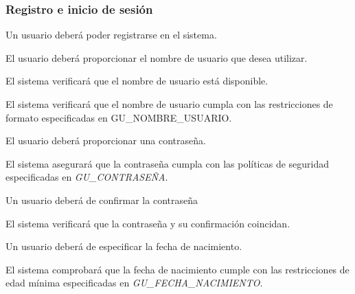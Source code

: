 


\subsubsection*{Registro e inicio de sesión}
\begin{RFGestionUsuarios}
	\item Un usuario deberá poder registrarse en el sistema.\label{req_registro}
	\begin{RFGestionUsuarios}
		\item El usuario deberá proporcionar el nombre de usuario que desea utilizar.
			\begin{RFGestionUsuarios}
				\item El sistema verificará que el nombre de usuario está disponible.
				\item El sistema verificará que el nombre de usuario cumpla con las restricciones de formato especificadas en GU\_NOMBRE\_USUARIO.
			\end{RFGestionUsuarios} 
		\item El usuario deberá proporcionar una contraseña.
			\begin{RFGestionUsuarios}
				\item El sistema asegurará que la contraseña cumpla con las políticas de seguridad especificadas en \textit{GU\_CONTRASEÑA}.
			\end{RFGestionUsuarios}
		\item Un usuario deberá de confirmar la contraseña
			\begin{RFGestionUsuarios}
				\item El sistema verificará que la contraseña y su confirmación coincidan.
			\end{RFGestionUsuarios}
		\item Un usuario deberá de especificar la fecha de nacimiento.
			\begin{RFGestionUsuarios}
				\item El sistema comprobará que la fecha de nacimiento cumple con las restricciones de edad mínima especificadas en \textit{GU\_FECHA\_NACIMIENTO}.

\end{RFGestionUsuarios}
\end{RFGestionUsuarios}
\end{RFGestionUsuarios}
